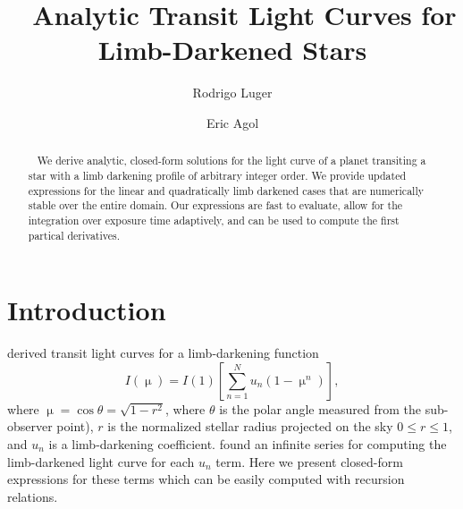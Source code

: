 \documentclass[modern]{aastex61}
\begin{document}

\setlength{\abovedisplayskip}{1.5em}
\setlength{\belowdisplayskip}{1.5em}

\title{%
    Analytic Transit Light Curves for Limb-Darkened Stars
}

\author[0000-0002-0296-3826]{Rodrigo Luger}
\author{Eric Agol}


\begin{abstract}
    We derive analytic, closed-form solutions for the light curve
    of a planet transiting a star with a limb darkening profile of
    arbitrary integer order.  We provide updated expressions for the linear
    and quadratically limb darkened cases that are numerically stable
    over the entire domain.  Our expressions are fast to evaluate,
    allow for the integration over exposure time adaptively, and
    can be used to compute the first partical derivatives.
\end{abstract}

%
\section{Introduction}
\label{sec:intro}

\citet{Gimenez2006} derived transit light curves for a limb-darkening
function
\begin{equation}
I(\upmu) = I(1) \left[\sum_{n=1}^N u_n (1-\upmu^n) \right],
\end{equation}
where $\upmu = \cos{\theta} =\sqrt{1-r^2}$, where $\theta$ is the polar angle measured from the
sub-observer point), $r$ is the normalized stellar radius projected on the sky
$0\le r \le 1$, and $u_n$ is a limb-darkening coefficient.  \cite{Gimenez2006}
found an infinite series for computing the limb-darkened light curve for each $u_n$
term.  Here we present closed-form expressions for these terms which can be
easily computed with recursion relations.
\end{document}
